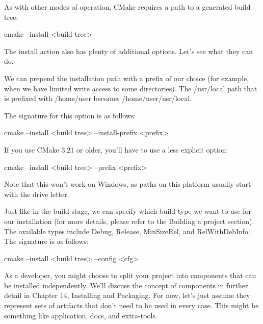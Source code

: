 As with other modes of operation, CMake requires a path to a generated build tree:

\begin{shell}
cmake --install <build tree>
\end{shell}

The install action also has plenty of additional options. Let’s see what they can do.


We can prepend the installation path with a prefix of our choice (for example, when we have limited write access to some directories). The /usr/local path that is prefixed with /home/user becomes /home/user/usr/local.

The signature for this option is as follows:

\begin{shell}
cmake --install <build tree> --install-prefix <prefix>
\end{shell}

If you use CMake 3.21 or older, you’ll have to use a less explicit option:

\begin{shell}
cmake --install <build tree> --prefix <prefix>
\end{shell}

Note that this won’t work on Windows, as paths on this platform usually start with the drive letter.


Just like in the build stage, we can specify which build type we want to use for our installation (for more details, please refer to the Building a project section). The available types include Debug, Release, MinSizeRel, and RelWithDebInfo. The signature is as follows:

\begin{shell}
cmake --install <build tree> --config <cfg>
\end{shell}


As a developer, you might choose to split your project into components that can be installed independently. We’ll discuss the concept of components in further detail in Chapter 14, Installing and Packaging. For now, let’s just assume they represent sets of artifacts that don’t need to be used in every case. This might be something like application, docs, and extra-tools.

